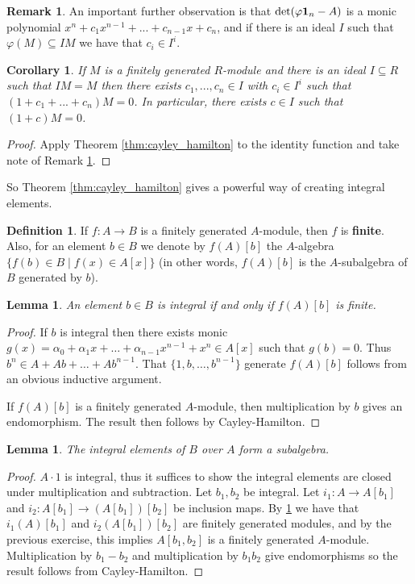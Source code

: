 \documentclass[12pt]{article}
\theoremstyle{plain}
\newtheorem{lemma}[thm]{Lemma}
\newtheorem{cor}[thm]{Corollary}
\theoremstyle{definition}
\newtheorem{defn}[thm]{Definition} %
\newtheorem{remark}[thm]{Remark}
\begin{document}
\begin{remark}
\label{remark:rest_of_CHT}
An important further observation is that $\operatorname{det}(\varphi\bold{1}_n - A)$ is a monic polynomial $x^n + c_1x^{n-1} + ... + c_{n-1}x + c_n$, and if there is an ideal $I$ such that $\varphi(M) \subseteq IM$ we have that $c_i \in I^i$.
\end{remark}
\begin{cor}
\label{cor:cayley_helpful_cor} If $M$ is a finitely generated $R$-module and there is an ideal $I \subseteq R$ such that $IM = M$ then there exists $c_1,...,c_n \in I$ with $c_i \in I^i$ such that $(1 + c_1 + ... + c_n)M = 0$. In particular, there exists $c \in I$ such that $(1 + c)M = 0$.
\end{cor}
\begin{proof}
Apply Theorem \ref{thm:cayley_hamilton} to the identity function and take note of Remark \ref{remark:rest_of_CHT}.
\end{proof}
So Theorem \ref{thm:cayley_hamilton} gives a powerful way of creating integral elements.
\begin{defn}
If $f: A \to B$ is a finitely generated $A$-module, then $f$ is \textbf{finite}. Also, for an element $b \in B$ we denote by $f(A)[b]$ the $A$-algebra $\lbrace f(b) \in B \mid f(x) \in A[x]\rbrace$ (in other words, $f(A)[b]$ is the $A$-subalgebra of $B$ generated by $b$).
\end{defn}
\begin{lemma}\label{lem:int_f(A)fin}
An element $b \in B$ is integral if and only if $f(A)[b]$ is finite.
\end{lemma}
\begin{proof}
If $b$ is integral then there exists monic $g(x) = \alpha_0 + \alpha_1x + \hdots + \alpha_{n-1}x^{n-1} + x^n \in A[x]$ such that $g(b) = 0$. Thus $b^n \in A + Ab + \hdots + Ab^{n-1}$. That $\lbrace 1, b, \hdots, b^{n-1}\rbrace$ generate $f(A)[b]$ follows from an obvious inductive argument.

If $f(A)[b]$ is a finitely generated $A$-module, then multiplication by $b$ gives an endomorphism. The result then follows by Cayley-Hamilton.
\end{proof}
\begin{lemma}
\label{lem:int_elts_subalg}
The integral elements of $B$ over $A$ form a subalgebra.
\end{lemma}
\begin{proof}
$A\cdot 1$ is integral, thus it suffices to show the integral elements are closed under multiplication and subtraction. Let $b_1,b_2$ be integral. Let $i_1: A \to A[b_1]$ and $i_2: A[b_1] \to (A[b_1])[b_2]$ be inclusion maps. By \ref{lem:int_f(A)fin} we have that $i_1(A)[b_1]$ and $i_2(A[b_1])[b_2]$ are finitely generated modules, and by the previous exercise, this implies $A[b_1,b_2]$ is a finitely generated $A$-module. Multiplication by $b_1 - b_2$ and multiplication by $b_1b_2$ give endomorphisms so the result follows from Cayley-Hamilton.
\end{proof}
\end{document}

